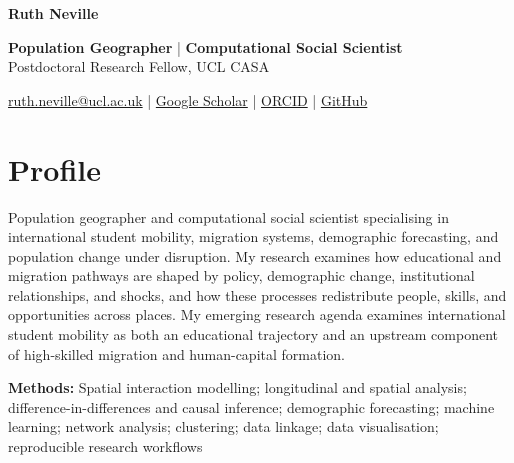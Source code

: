 \documentclass[a4paper,10.5pt]{article}
\newcommand{\cvname}[1]{%
  \begin{center}
    {\fontsize{20pt}{22pt}\selectfont\bfseries #1}
  \end{center}
  \vspace{-5pt}
}
\newcommand{\cvsubtitle}[1]{%
  \begin{center}
    {\small #1}
  \end{center}
  \vspace{-4pt}
}
\newcommand{\cvcontact}[1]{%
  \begin{center}
    {\small\color{mutedtext} #1}
  \end{center}
  \vspace{-2pt}
}
\newcommand{\skillline}[2]{%
  \vspace{2pt}
  {\small\textbf{#1:} #2\par}
}
\begin{document}


\cvname{Ruth Neville}

\cvsubtitle{%
  \textbf{Population Geographer}
  \hspace{0.4em}|\hspace{0.4em}
  \textbf{Computational Social Scientist}\\
  Postdoctoral Research Fellow, UCL CASA
}

\cvcontact{%
  \href{mailto:ruth.neville@ucl.ac.uk}{ruth.neville@ucl.ac.uk}
  \hspace{0.5em}|\hspace{0.5em}
  \href{https://scholar.google.com/citations?user=s_oU91kAAAAJ&hl=en}{Google Scholar}
  \hspace{0.5em}|\hspace{0.5em}
  \href{https://orcid.org/0009-0003-0278-2675}{ORCID}
  \hspace{0.5em}|\hspace{0.5em}
  \href{https://github.com/ruthneville}{GitHub}
}

\vspace{2pt}

\section{Profile}

{\small
Population geographer and computational social scientist specialising in
international student mobility, migration systems, demographic forecasting,
and population change under disruption. My research examines how educational
and migration pathways are shaped by policy, demographic change, institutional
relationships, and shocks, and how these processes redistribute people, skills,
and opportunities across places. My emerging research agenda examines
international student mobility as both an educational trajectory and an
upstream component of high-skilled migration and human-capital formation.
}

\skillline{Methods}{
Spatial interaction modelling; longitudinal and spatial analysis;
difference-in-differences and causal inference; demographic forecasting;
machine learning; network analysis; clustering; data linkage;
data visualisation; reproducible research workflows
}
\end{document}
